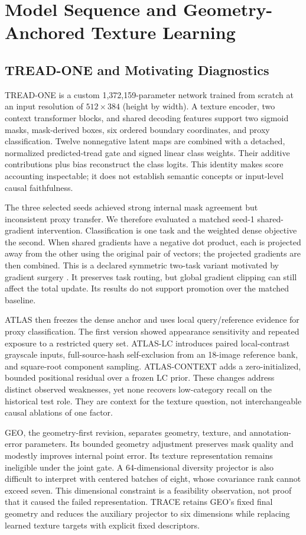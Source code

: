 \section{Model Sequence and Geometry-Anchored Texture Learning}\label{sec:models}
\subsection{TREAD-ONE and Motivating Diagnostics}
TREAD-ONE is a custom 1,372,159-parameter network trained from scratch at an input resolution of $512\times384$ (height by width). A texture encoder, two context transformer blocks, and shared decoding features support two sigmoid masks, mask-derived boxes, six ordered boundary coordinates, and proxy classification. Twelve nonnegative latent maps are combined with a detached, normalized predicted-tread gate and signed linear class weights. Their additive contributions plus bias reconstruct the class logits. This identity makes score accounting inspectable; it does not establish semantic concepts or input-level causal faithfulness.\AIdraftingnote

The three selected seeds achieved strong internal mask agreement but inconsistent proxy transfer. We therefore evaluated a matched seed-1 shared-gradient intervention. Classification is one task and the weighted dense objective the second. When shared gradients have a negative dot product, each is projected away from the other using the original pair of vectors; the projected gradients are then combined. This is a declared symmetric two-task variant motivated by gradient surgery \cite{pcgrad}. It preserves task routing, but global gradient clipping can still affect the total update. Its results do not support promotion over the matched baseline.

ATLAS then freezes the dense anchor and uses local query/reference evidence for proxy classification. The first version showed appearance sensitivity and repeated exposure to a restricted query set. ATLAS-LC introduces paired local-contrast grayscale inputs, full-source-hash self-exclusion from an 18-image reference bank, and square-root component sampling. ATLAS-CONTEXT adds a zero-initialized, bounded positional residual over a frozen LC prior. These changes address distinct observed weaknesses, yet none recovers low-category recall on the historical test role. They are context for the texture question, not interchangeable causal ablations of one factor.

GEO, the geometry-first revision, separates geometry, texture, and annotation-error parameters. Its bounded geometry adjustment preserves mask quality and modestly improves internal point error. Its texture representation remains ineligible under the joint gate. A 64-dimensional diversity projector is also difficult to interpret with centered batches of eight, whose covariance rank cannot exceed seven. This dimensional constraint is a feasibility observation, not proof that it caused the failed representation. TRACE retains GEO's fixed final geometry and reduces the auxiliary projector to six dimensions while replacing learned texture targets with explicit fixed descriptors.

